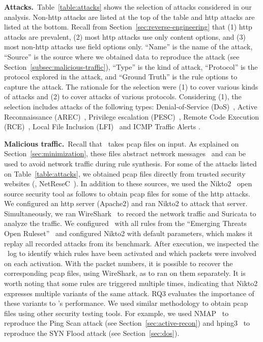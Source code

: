 \documentclass[conference]{IEEEtran}
\begin{document}
\noindent\textbf{Attacks.}~Table~\ref{table:attacks} shows the selection
of attacks considered in our analysis.  Non-http attacks are listed at 
the top of the table and http attacks are listed at the bottom. Recall from
Section~\ref{sec:reverse-engineering} that (1) http attacks are
prevalent, (2) most http attacks use only content options, and (3)
most non-http attacks use field options only. %
``Name'' is the name of the attack,
``Source'' is the source where we obtained data to reproduce the
attack (see Section~\ref{subsec:malicious-traffic}), ``Type''
is the kind of attack, ``Protocol'' is the
protocol explored in the attack, and ``Ground Truth'' is the
rule options to capture the attack. The rationale for the selection
were (1) to cover various kinds of attacks and (2) to cover attacks of
various protocols. Considering (1), the selection includes attacks of
the following types: Denial-of-Service (DoS)~\cite{denial-of-service},
Active Reconnaissance (AREC)~\cite{active-reconnaissance}, Privilege
escalation (PESC)~\cite{privilege-escalation}, Remote Code Execution
(RCE)~\cite{remote-code-execution}, Local File Inclusion
(LFI)~\cite{local-file-inclusion} and ICMP Traffic Alerts \cite{icmp-types}.

\noindent\textbf{Malicious traffic.}~Recall that \tname\ takes
pcap files on input. As explained on Section~\ref{sec:minimization},
these files abstract network messages~\cite{pcap} and can be used to
avoid network traffic during rule synthesis. For some of the attacks
listed on Table~\ref{table:attacks}, we obtained pcap files directly
from trusted security websites (\eg{},
NetReseC~\cite{pcap-attacks}). In addition to these sources, we used
the Nikto2~\cite{nikto} open source security tool as follows to obtain
pcap files for some of the http attacks. We configured an http server
(Apache2) and ran Nikto2 to attack that server. Simultaneously, we ran
WireShark~\cite{wireshark-net-monitor} to record the network traffic
and Suricata to analyze the traffic. We configured \suri\ with all
rules from the ``Emerging Threats Open
Ruleset''~\cite{emerging-threats-open} and configured Nikto2 with
default parameters, which makes it replay all recorded attacks from
its benchmark. After execution, we inspected the \suri\ log to
identify which rules have been activated and which packets were
involved on each activation. With the packet numbers, it is possible
to recover the corresponding pcap files, using WireShark, as to ran
\tname{} on them separately. It is worth noting that some rules are
triggered multiple times, indicating that Nikto2 expresses multiple
variants of the same attack. RQ3 evaluates the importance of these
variants to \tname{}'s performance. We used similar methodology to
obtain pcap files using other security testing tools. For example, we
used NMAP~\cite{netmap} to reproduce the Ping Scan attack (see
Section~\ref{sec:active-recon}) and hping3~\cite{hping3} to reproduce
the SYN Flood attack (see Section~\ref{sec:dos}).
\end{document}
